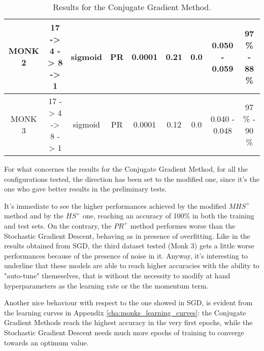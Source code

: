 \begin{table}[H]
\begin{subtable}{\textwidth}
{\begin{tabular}{| c | c | c | c | c | c | c | c | c |}
                            \hline
                            MONK 2 & 17 -> 4 -> 8 -> 1 & sigmoid & PR & 0.0001 & 0.21 & 0.0
                            & 0.050 - 0.059 & 97 \% - 88 \% \\
                            \hline
                            MONK 3 & 17 -> 4 -> 8 -> 1 & sigmoid & PR & 0.0001 & 0.12 & 0.0
                            & 0.040 - 0.048 & 97 \% - 90 \% \\
                            \hline
                        \end{tabular}
                    }
                \end{subtable}
                \caption{Results for the Conjugate Gradient Method.}
                \label{tab:monks_cgd}
        \end{table}

        For what concernes the results for the Conjugate Gradient Method, for all the configurations tested,
        the direction has been set to the modified one, since it's the one who gave better results in the preliminary tests.

        It's immediate to see the higher performances achieved by the modified $MHS^+$ method and by the $HS^+$ one, reaching an accuracy of 100\% in both
        the training and test sets. On the contrary, the $PR^+$ method performes worse than the Stochastic
        Gradient Descent, behaving as in presence of overfitting. Like in the results obtained from SGD, the third dataset tested (Monk 3) gets a little worse performances because of the presence of noise in it.
        Anyway, it's interesting to underline that these models are able to reach higher accuracies with the
        ability to "auto-tune" themeselves, that is without the necessity to modify at hand hyperparameters as the learning rate or the the momentum term.

        Another nice behaviour with respect to the one showed in SGD, is evident from the learning curves in Appendix \ref{cha:monks_learning_curves}: the Conjugate Gradient Methods reach the highest accuracy in the very first epochs, while the Stochastic Gradient Descent needs much more epochs of training to converge towards an optimum value.


